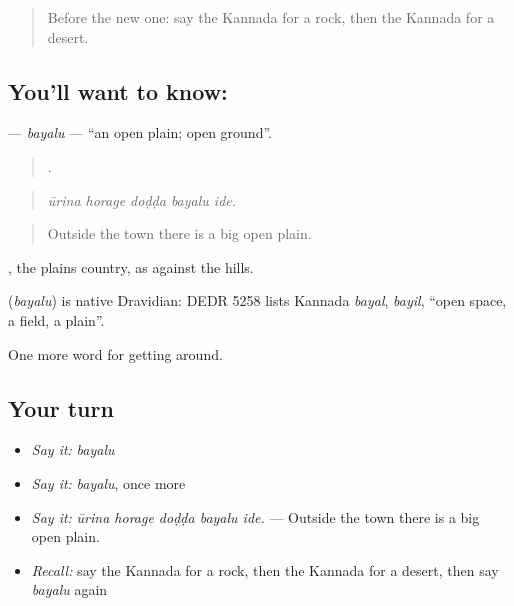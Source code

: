 \label{lesson:KA-C480-bayalu}



\begin{quote}
Before the new one: say the Kannada for a rock, then the Kannada for a desert.
\end{quote}

\subsection*{You'll want to know: }
\textbf{} — \emph{bayalu} — \textquotedblleft{}an open plain; open ground\textquotedblright{}.

\begin{quote}
    .
\end{quote}

\begin{quote}
\emph{ūrina horage doḍḍa bayalu ide.}
\end{quote}

\begin{quote}
Outside the town there is a big open plain.
\end{quote}

, the plains country, as against the hills.

\begin{cousinweb}
\textbf{} (\emph{bayalu}) is native Dravidian: DEDR 5258 lists Kannada \emph{bayal}, \emph{bayil}, \textquotedblleft{}open space, a field, a plain\textquotedblright{}.
\end{cousinweb}

\begin{grammarlens}[title={What you've built}]
One more word for getting around.
\end{grammarlens}

\subsection*{Your turn}
\begin{itemize}
\raggedright
  \item \emph{Say it:} \emph{bayalu}
  \item \emph{Say it:} \emph{bayalu}, once more
  \item \emph{Say it:} \emph{ūrina horage doḍḍa bayalu ide.} — Outside the town there is a big open plain.
  \item \emph{Recall:} say the Kannada for a rock, then the Kannada for a desert, then say \emph{bayalu} again
\end{itemize}

